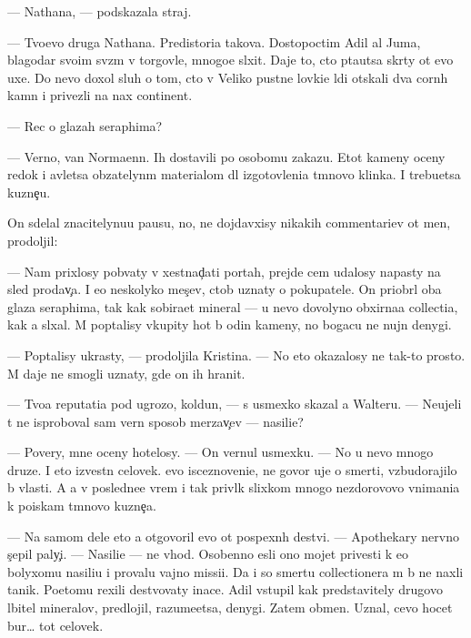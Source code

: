 \documentclass[10pt]{book}
\begin{document}
— Nathana, — podskazala straj.

— Tvo{\y}evo druga Nathana. Predistori{\y}a takova. Dostopoctim{\yi}{\y} Adil al Juma, blagodar{\ia} svo{\y}im sv{\ia}z{\ia}m v torgovle, mnogo{\y}e sl{\yi}xit. Daje to, cto p{\yi}ta{\y}utsa skr{\yi}ty ot {\y}evo uxe{\y}. Do nevo doxol sluh o tom, cto v Veliko{\y} pust{\yi}ne lovki{\y}e l{\io}di ot{\yi}skali dva corn{\yi}h kamn{\ia} i privezli na nax continent.

— Rec o glazah seraphima?

— Verno, van Normaenn. Ih dostavili po osobomu zakazu. Etot kameny oceny redok i {\y}avl{\ia}{\y}etsa ob{\ia}zatelyn{\yi}m materialom dl{\ia} izgotovleni{\y}a t{\e}mnovo klinka. I trebu{\y}etsa kuzne{\c}u.

On sdelal znacitelynu{\y}u pausu, no, ne dojdavxisy nikakih commentari{\y}ev ot men{\ia}, prodoljil:

— Nam prixlosy pob{\yi}vaty v xestnad{\c}ati portah, prejde cem udalosy napasty na sled prodav{\c}a. I {\y}e{\x}o neskolyko mes{\ia}{\c}ev, ctob{\yi} uznaty o pokupatele. On priobr{\e}l oba glaza seraphima, tak kak sobira{\y}et mineral{\yi} — u nevo dovolyno obxirna{\y}a collecti{\y}a, kak {\y}a sl{\yi}xal. M{\yi} pop{\yi}talisy v{\yi}kupity hot{\ia} b{\yi} odin kameny, no bogacu ne nujn{\yi} denygi.

— Pop{\yi}talisy ukrasty, — prodoljila Kristina. — No eto okazalosy ne tak-to prosto. M{\yi} daje ne smogli uznaty, gde on ih hranit.

— Tvo{\y}a reputati{\y}a pod ugrozo{\y}, koldun, — s usmexko{\y} skazal {\y}a Walteru. — Neujeli t{\yi} ne isproboval sam{\yi}{\y} vern{\yi}{\y} sposob merzav{\c}ev — nasili{\y}e?

— Povery, mne oceny hotelosy. — On vernul usmexku. — No u nevo mnogo druze{\y}. I eto izvestn{\yi}{\y} celovek. {\Y}evo isceznoveni{\y}e, ne govor{\ia} uje o smerti, vzbudorajilo b{\yi} vlasti. A {\y}a v posledne{\y}e vrem{\ia} i tak privl{\e}k slixkom mnogo nezdorovovo vnimani{\y}a k poiskam t{\e}mnovo kuzne{\c}a.

— Na samom dele eto {\y}a otgovoril {\y}evo ot pospexn{\yi}h de{\y}stvi{\y}. — Apothekary nervno s{\c}epil paly{\c}i. — Nasili{\y}e — ne v{\yi}hod. Osobenno {\y}esli ono mojet privesti k {\y}e{\x}o bolyxomu nasili{\y}u i provalu vajno{\y} missi{\y}i. Da i so smert{\y}u collectionera m{\yi} b{\yi} ne naxli ta{\y}nik. Poetomu rexili de{\y}stvovaty inace. Adil v{\yi}stupil kak predstavitely drugovo l{\io}bitel{\ia} mineralov, predlojil, razume{\y}etsa, denygi. Zatem obmen. Uznal, cevo hocet bur… tot celovek.
\end{document}
